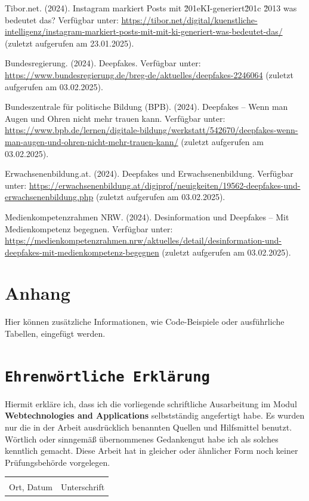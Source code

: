 \documentclass[a4paper,12pt]{article}
\begin{document}
\begin{thebibliography}{99}
     Tibor.net. (2024). Instagram markiert Posts mit \u201eKI-generiert\u201c \u2013 was bedeutet das? 
    Verfügbar unter: \url{https://tibor.net/digital/kuenstliche-intelligenz/instagram-markiert-posts-mit-mit-ki-generiert-was-bedeutet-das/} (zuletzt aufgerufen am 23.01.2025).
    
     Bundesregierung. (2024). Deepfakes. 
    Verfügbar unter: \url{https://www.bundesregierung.de/breg-de/aktuelles/deepfakes-2246064} (zuletzt aufgerufen am 03.02.2025).
    
     Bundeszentrale für politische Bildung (BPB). (2024). Deepfakes – Wenn man Augen und Ohren nicht mehr trauen kann. 
    Verfügbar unter: \url{https://www.bpb.de/lernen/digitale-bildung/werkstatt/542670/deepfakes-wenn-man-augen-und-ohren-nicht-mehr-trauen-kann/} (zuletzt aufgerufen am 03.02.2025).
    
     Erwachsenenbildung.at. (2024). Deepfakes und Erwachsenenbildung. 
    Verfügbar unter: \url{https://erwachsenenbildung.at/digiprof/neuigkeiten/19562-deepfakes-und-erwachsenenbildung.php} (zuletzt aufgerufen am 03.02.2025).
    
     Medienkompetenzrahmen NRW. (2024). Desinformation und Deepfakes – Mit Medienkompetenz begegnen. 
    Verfügbar unter: \url{https://medienkompetenzrahmen.nrw/aktuelles/detail/desinformation-und-deepfakes-mit-medienkompetenz-begegnen} (zuletzt aufgerufen am 03.02.2025).
    
\end{thebibliography}
\newpage
\appendix
\section{Anhang}
Hier können zusätzliche Informationen, wie Code-Beispiele oder ausführliche Tabellen, eingefügt werden.

\newpage
{}
\section*{\texttt{Ehrenwörtliche Erklärung}}
Hiermit erkläre ich, dass ich die vorliegende schriftliche Ausarbeitung im Modul \textbf{Webtechnologies and Applications} selbstständig
angefertigt habe. Es wurden nur die in der Arbeit ausdrücklich benannten Quellen und
Hilfsmittel benutzt. Wörtlich oder sinngemäß übernommenes Gedankengut habe ich als
solches kenntlich gemacht. Diese Arbeit hat in gleicher oder ähnlicher Form noch keiner
Prüfungsbehörde vorgelegen.

\vspace{3cm}
\noindent\begin{tabular}{p{}p{}}
    \hrulefill & \hrulefill \\
    Ort, Datum & Unterschrift \\
\end{tabular}
\end{document}
